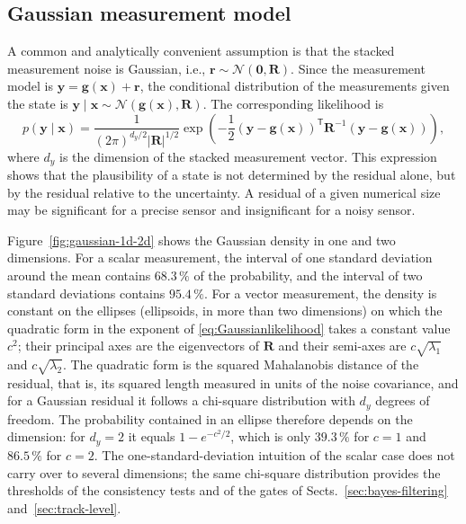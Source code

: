 \subsection{Gaussian measurement model}
A common and analytically convenient assumption is that the stacked measurement noise is Gaussian, i.e., $\mathbf{r} \sim \mathcal{N} \left( \mathbf{0}, \mathbf{R} \right)$. Since the measurement model is $\mathbf{y}=\mathbf{g}(\mathbf{x})+\mathbf{r}$, the conditional distribution of the measurements given the state is $\mathbf{y}\mid\mathbf{x} \sim \mathcal{N} \left( \mathbf{g}(\mathbf{x}), \mathbf{R} \right)$. 
The corresponding likelihood is
\begin{equation}
\label{eq:Gaussianlikelihood}
p(\mathbf{y}\mid\mathbf{x}) = \frac{1}{(2\pi)^{d_y/2}|\mathbf{R}|^{1/2}}\exp \left( - \frac{1}{2} \left( \mathbf{y}-\mathbf{g}(\mathbf{x})\right)^{\mathsf T}\mathbf{R}^{-1}\left(\mathbf{y}-\mathbf{g}(\mathbf{x})\right)\right),
\end{equation}
where $d_y$ is the dimension of the stacked measurement vector. This expression shows that the plausibility of a state is not determined by the residual alone, but by the residual relative to the uncertainty. A residual of a given numerical size may be significant for a precise sensor and insignificant for a noisy sensor.

Figure~\ref{fig:gaussian-1d-2d} shows the Gaussian density in one and two dimensions. For a scalar measurement, the interval of one standard deviation around the mean contains $68.3\,\%$ of the probability, and the interval of two standard deviations contains $95.4\,\%$. For a vector measurement, the density is constant on the ellipses (ellipsoids, in more than two dimensions) on which the quadratic form in the exponent of \eqref{eq:Gaussianlikelihood} takes a constant value $c^2$; their principal axes are the eigenvectors of $\mathbf{R}$ and their semi-axes are $c\sqrt{\lambda_1}$ and $c\sqrt{\lambda_2}$. The quadratic form is the squared Mahalanobis distance of the residual, that is, its squared length measured in units of the noise covariance, and for a Gaussian residual it follows a chi-square distribution with $d_y$ degrees of freedom. The probability contained in an ellipse therefore depends on the dimension: for $d_y=2$ it equals $1-e^{-c^2/2}$, which is only $39.3\,\%$ for $c=1$ and $86.5\,\%$ for $c=2$. The one-standard-deviation intuition of the scalar case does not carry over to several dimensions; the same chi-square distribution provides the thresholds of the consistency tests and of the gates of Sects.~\ref{sec:bayes-filtering} and~\ref{sec:track-level}.

